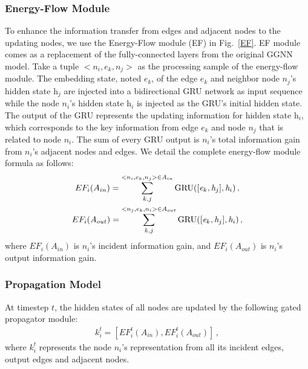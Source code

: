 \documentclass[letterpaper]{article} %
\begin{document}
\subsubsection{Energy-Flow Module}
To enhance the information transfer from edges and adjacent nodes to the updating nodes, we use the Energy-Flow module (EF) in Fig.~\ref{EF}.
EF module comes as a replacement of the fully-connected layers from the original GGNN model. 
Take a tuple $<{n}_i, {e}_k, {n}_j>$ as the processing sample of the energy-flow module. 
The embedding state, noted $\textit{e}_k$, of the edge ${e}_k$ and neighbor node ${n}_j$'s hidden state $\textit{h}_j$ are injected into a bidirectional GRU network as input sequence while the node ${n}_i$'s hidden state $\textit{h}_i$ is injected as the GRU's initial hidden state. 
The output of the GRU represents the updating information for hidden state $\textit{h}_i$, which corresponds to the key information from edge ${e}_k$ and node ${n}_j$ that is related to node ${n}_i$. 
The sum of every GRU output is ${n}_i$'s total information gain from ${n}_i$'s adjacent nodes and edges. 
We detail the complete energy-flow module formula as follows:
\begin{gather}\notag
    EF_i(A_{in}) = \sum\limits_{k,j}^{<n_i,e_k,n_j>\in A_{in}} \text{GRU}([\textit{e}_k, \textit{h}_j], \textit{h}_i) \, , \\ \notag
    EF_i(A_{out}) = \sum\limits_{k,j}^{<{n}_j,{e}_k,{n}_i>\in A_{out}} \text{GRU}([\textit{e}_k, \textit{h}_j], \textit{h}_i) \, ,\notag
\end{gather}
where $EF_i(A_{in})$ is ${n}_i$'s incident information gain, and $EF_i(A_{out})$ is ${n}_i$'s output information gain.


\medskip
\subsubsection{Propagation Model}

At timestep $t$, the hidden states of all nodes are updated by the following gated propagator module:
\begin{gather}
    k_{i}^t = [EF_i^t(A_{in}), EF_i^t(A_{out})] \, ,
\end{gather}
where $k_{i}^t$ represents the node ${n}_i$'s representation from all its incident edges, output edges and adjacent nodes.
\end{document}
